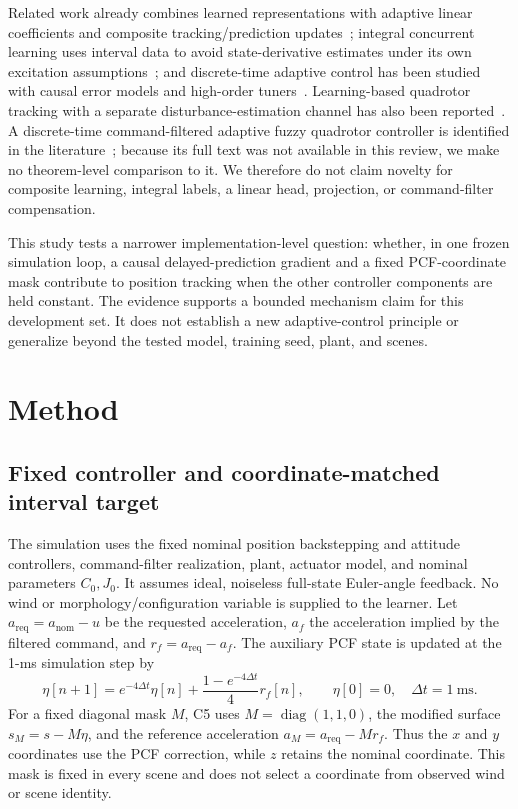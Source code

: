 \documentclass[11pt]{article}
\begin{document}
Related work already combines learned representations with adaptive linear coefficients and composite tracking/prediction updates~\cite{oconnell2022neuralfly}; integral concurrent learning uses interval data to avoid state-derivative estimates under its own excitation assumptions~\cite{parikh2019integral}; and discrete-time adaptive control has been studied with causal error models and high-order tuners~\cite{fisher2023discrete}. Learning-based quadrotor tracking with a separate disturbance-estimation channel has also been reported~\cite{huang2023datt}. A discrete-time command-filtered adaptive fuzzy quadrotor controller is identified in the literature~\cite{zhao2024commandfilter}; because its full text was not available in this review, we make no theorem-level comparison to it. We therefore do not claim novelty for composite learning, integral labels, a linear head, projection, or command-filter compensation.

This study tests a narrower implementation-level question: whether, in one frozen simulation loop, a causal delayed-prediction gradient and a fixed PCF-coordinate mask contribute to position tracking when the other controller components are held constant. The evidence supports a bounded mechanism claim for this development set. It does not establish a new adaptive-control principle or generalize beyond the tested model, training seed, plant, and scenes.

\section{Method}
\subsection{Fixed controller and coordinate-matched interval target}
The simulation uses the fixed nominal position backstepping and attitude controllers, command-filter realization, plant, actuator model, and nominal parameters $C_0,J_0$. It assumes ideal, noiseless full-state Euler-angle feedback. No wind or morphology/configuration variable is supplied to the learner. Let $a_{\mathrm{req}}=a_{\mathrm{nom}}-u$ be the requested acceleration, $a_f$ the acceleration implied by the filtered command, and $r_f=a_{\mathrm{req}}-a_f$. The auxiliary PCF state is updated at the 1-ms simulation step by
\begin{equation}
  \eta[n+1]=e^{-4\Delta t}\eta[n]
       +\frac{1-e^{-4\Delta t}}{4}r_f[n],
  \qquad \eta[0]=0, \quad \Delta t=1~\mathrm{ms}.
\end{equation}
For a fixed diagonal mask $M$, C5 uses $M=\operatorname{diag}(1,1,0)$, the modified surface $s_M=s-M\eta$, and the reference acceleration $a_M=a_{\mathrm{req}}-Mr_f$. Thus the $x$ and $y$ coordinates use the PCF correction, while $z$ retains the nominal coordinate. This mask is fixed in every scene and does not select a coordinate from observed wind or scene identity.
\end{document}
